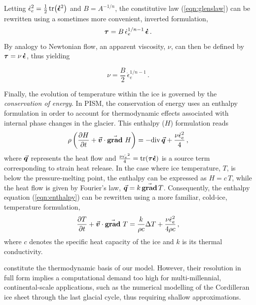 \documentclass{article}
\newcommand{\vect}[1]{\va*{#1}} %
\newcommand{\tens}[1]{\vb*{#1}} %
\renewcommand{\div}[1]{\mathrm{div}\,#1}            %
\renewcommand{\grad}[1]{\vect{\mathrm{grad}}\,#1}   %
\newcommand{\matdv}[1]{\pdv{#1}{t}+\vect{v}\cdot\grad{}\,#1}  %
\newcommand{\doteps}[0]{\dot{\epsilon}} %
\newcommand{\DST}[0]{\tens{\tau}}       %
\newcommand{\SRT}[0]{\tens{\doteps}}    %
\begin{document}
Letting ${\doteps_e}^2 = \frac{1}{2} \tr(\SRT^2)$ and $B=A^{-1/n}$, the
constitutive law (\ref{eqn:glenslaw}) can be rewritten using a sometimes more
convenient, inverted formulation,
\begin{equation}
    \label{eqn:invglenslaw}
    \DST = B\,\doteps_e^{1/n-1}\,\SRT \,.
\end{equation}
By analogy to Newtonian flow, an apparent viscosity, $\nu$, can then be defined
by $\DST = \nu\,\SRT$, thus yielding

\begin{equation}
    \label{eqn:viscosity}
    \nu = \frac{B}{2}\,\doteps_e^{1/n-1} \,.
\end{equation}

Finally, the evolution of temperature within the ice is governed by the
\emph{conservation of energy}. In PISM, the conservation of energy uses an
enthalpy formulation in order to account for thermodynamic effects associated
with internal phase changes in the glacier. This enthalpy ($H$) formulation
reads
\begin{equation}
    \label{eqn:enthalpy}
    \rho \left(\matdv{H}\right)
        = -\div{\vect{q}} + \frac{\nu\doteps_e^2}{4} \,,
\end{equation}
where $\vect{q}$ represents the heat flow and
${\frac{\nu\dot{\epsilon_e}^2}{4} = \tr(\DST\SRT)}$ is a
source term corresponding to strain heat release. In the case where ice
temperature, $T$, is below the pressure-melting point, the enthalpy can be
expressed as $H=c\,T$, while the heat flow is given by Fourier's law,
$\vect{q} = k\,\grad{T}$. Consequently, the enthalpy equation
(\ref{eqn:enthalpy}) can be rewritten using a more familiar, cold-ice,
temperature formulation,
\begin{equation}
    \label{eqn:temperature}
    \matdv{T} = \frac{k}{\rho c} \Delta T
                + \frac{\nu\doteps_e^2}{4\rho c} \,,
\end{equation}
where $c$ denotes the specific heat capacity of the ice and $k$ is its thermal
conductivity.

constitute the thermodynamic basis
of our model. However, their resolution in full form implies a computational
demand too high for multi-millennial, continental-scale applications, such as
the numerical modelling of the Cordilleran ice sheet through the last glacial
cycle, thus requiring shallow approximations.
\end{document}
